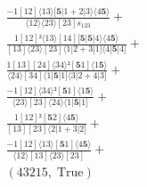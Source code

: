 \documentclass[varwidth, border=5pt]{standalone}
\begin{document}
\begin{my}
$\begin{gathered}
\scriptscriptstyle\frac{-1[12]⟨13⟩[𝟓|1+2|3⟩⟨4𝟓⟩}{⟨12⟩⟨23⟩[23]s_{123}} +\\
\scriptscriptstyle\frac{1[12]²⟨13⟩[14][𝟓|𝟓|4⟩⟨4𝟓⟩}{[13]⟨23⟩[23]⟨1|2+3|1]⟨4|𝟓|4]} +\\
\scriptscriptstyle\frac{1[13][24]⟨34⟩²[𝟓1]⟨1𝟓⟩}{⟨24⟩[34]⟨1|𝟓|1]⟨3|2+4|3]} +\\
\scriptscriptstyle\frac{-1[12]⟨34⟩²[𝟓1]⟨1𝟓⟩}{⟨23⟩[23]⟨24⟩⟨1|𝟓|1]} +\\
\scriptscriptstyle\frac{1[12]²[𝟓2]⟨4𝟓⟩}{[13][23]⟨2|1+3|2]} +\\
\scriptscriptstyle\frac{-1[12]⟨13⟩[𝟓1]⟨4𝟓⟩}{⟨12⟩[13]⟨23⟩[23]} +\\
\scriptscriptstyle(43215,\;\text{True}) \phantom{+}
\end{gathered}$
\end{my}
\end{document}
